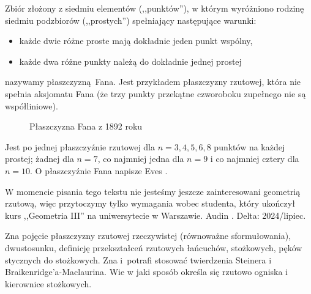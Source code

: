 \begin{example}
    Zbiór złożony z siedmiu elementów (,,punktów''), w którym wyróżniono rodzinę siedmiu podzbiorów (,,prostych'') spełniający następujące warunki: 
    \begin{itemize}
        \item każde dwie różne proste mają dokładnie jeden punkt wspólny,
        \item każde dwa różne punkty należą do dokładnie jednej prostej
    \end{itemize}
    nazywamy płaszczyzną Fana.
    Jest przykładem płaszczyzny rzutowej, która nie spełnia aksjomatu Fana (że trzy punkty przekątne czworoboku zupełnego nie są współliniowe). 
    \begin{figure}[H]
        \centering
    \caption{Płaszczyzna Fana z 1892 roku}
\end{figure}
\end{example}

Jest po jednej płaszczyźnie rzutowej dla $n = 3, 4, 5, 6, 8$ punktów na każdej prostej; żadnej dla $n = 7$, co najmniej jedna dla $n = 9$ i co najmniej cztery dla $n = 10$.
O płaszczyźnie Fana napisze Eves \cite[s. 366]{eves1_1972}.

W momencie pisania tego tekstu nie jesteśmy jeszcze zainteresowani geometrią rzutową, więc przytoczymy tylko wymagania wobec studenta, który ukończył kurs ,,Geometria III'' na uniwersytecie w Warszawie.
Audin \cite[s. 143-182]{audin_2003}.
Delta: 2024/lipiec.

Zna pojęcie płaszczyzny rzutowej rzeczywistej (równoważne sformułowania), dwustosunku, definicję przekształceń rzutowych łańcuchów, stożkowych, pęków stycznych do stożkowych.
%
%
%
Zna i~potrafi stosować twierdzenia Steinera i Braikenridge'a-Maclaurina.
%
%
Wie w jaki sposób określa się rzutowo ogniska i kierownice stożkowych.
%
%

